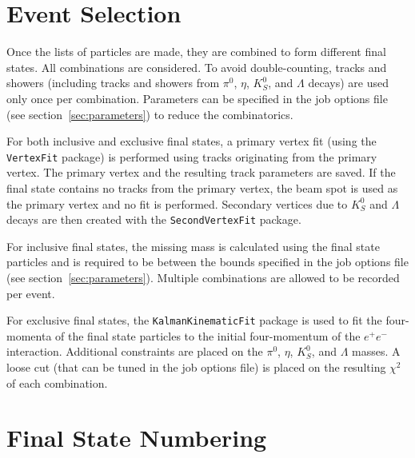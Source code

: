 \documentclass[11pt]{article}
\begin{document}
\section{Event Selection}
\label{sec:event}

Once the lists of particles are made, they are combined to form different final states.  All combinations are considered.  To avoid double-counting, tracks and showers (including tracks and showers from $\pi^0$, $\eta$, $K^0_S$, and $\Lambda$ decays) are used only once per combination.  Parameters can be specified in the job options file (see section~\ref{sec:parameters}) to reduce the combinatorics.

For both inclusive and exclusive final states, a primary vertex fit (using the {\tt VertexFit} package) is performed using tracks originating from the primary vertex.  The primary vertex and the resulting track parameters are saved.  If the final state contains no tracks from the primary vertex, the beam spot is used as the primary vertex and no fit is performed.  Secondary vertices due to $K^0_S$ and $\Lambda$ decays are then created with the {\tt SecondVertexFit} package.

For inclusive final states, the missing mass is calculated using the final state particles and is required to be between the bounds specified in the job options file (see section~\ref{sec:parameters}).  Multiple combinations are allowed to be recorded per event.

For exclusive final states, the {\tt KalmanKinematicFit} package is used to fit the four-momenta of the final state particles to the initial four-momentum of the $e^+e^-$ interaction.  Additional constraints are placed on the $\pi^0$, $\eta$, $K^0_S$, and $\Lambda$ masses.  A loose cut (that can be tuned in the job options file) is placed on the resulting $\chi^2$ of each combination.


\section{Final State Numbering}
\label{sec:numbering}
\end{document}
